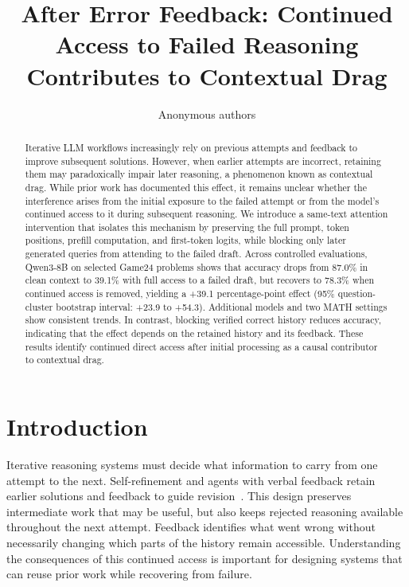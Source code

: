 \documentclass{article}
\title{After Error Feedback: Continued Access to Failed Reasoning Contributes to Contextual Drag}
\author{Anonymous authors}
\begin{document}
\maketitle

\begin{abstract}
Iterative LLM workflows increasingly rely on previous attempts and feedback to improve subsequent solutions. However, when earlier attempts are incorrect, retaining them may paradoxically impair later reasoning, a phenomenon known as contextual drag. While prior work has documented this effect, it remains unclear whether the interference arises from the initial exposure to the failed attempt or from the model's continued access to it during subsequent reasoning. We introduce a same-text attention intervention that isolates this mechanism by preserving the full prompt, token positions, prefill computation, and first-token logits, while blocking only later generated queries from attending to the failed draft. Across controlled evaluations, Qwen3-8B on selected Game24 problems shows that accuracy drops from 87.0\% in clean context to 39.1\% with full access to a failed draft, but recovers to 78.3\% when continued access is removed, yielding a +39.1 percentage-point effect (95\% question-cluster bootstrap interval: +23.9 to +54.3). Additional models and two MATH settings show consistent trends. In contrast, blocking verified correct history reduces accuracy, indicating that the effect depends on the retained history and its feedback. These results identify continued direct access after initial processing as a causal contributor to contextual drag.
\end{abstract}

\section{Introduction}

Iterative reasoning systems must decide what information to carry from one attempt to the next. Self-refinement and agents with verbal feedback retain earlier solutions and feedback to guide revision~\citep{madaan2023selfrefine,shinn2023reflexion}. This design preserves intermediate work that may be useful, but also keeps rejected reasoning available throughout the next attempt. Feedback identifies what went wrong without necessarily changing which parts of the history remain accessible. Understanding the consequences of this continued access is important for designing systems that can reuse prior work while recovering from failure.
\end{document}
